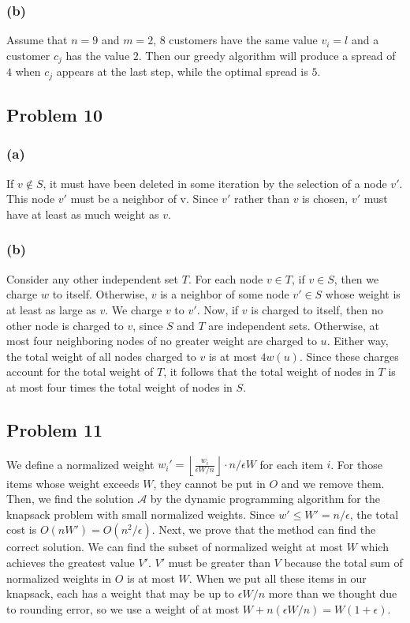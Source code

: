 \documentclass[12pt,onecolumn,a4paper]{article}
\begin{document}
\subsubsection*{(b)} 
Assume that $n=9$ and $m=2$, $8$ customers have the same value $v_i=l$ and a customer $c_j$ has the value $2$. Then our greedy algorithm will produce a spread of $4$ when $c_j$ appears at the last step, while the optimal spread is $5$.

\subsection*{Problem 10}
\subsubsection*{(a)} 
If $v \notin S$, it must have been deleted in some iteration by the selection of a node $v'$. This node $v'$ must be a neighbor of v. Since $v'$ rather than $v$ is chosen, $v'$ must have at least as much weight as $v$.
\subsubsection*{(b)} 
Consider any other independent set $T$. For each node $v \in T$, if $ v\in S$, then we charge $w$ to itself. Otherwise, $v$ is a neighbor of some node $ v'\in S$ whose weight is at least as large as $v$. We charge $v$ to $v'$. Now, if $v$ is charged to itself, then no other node is charged to $v$, since $S$ and $T$ are independent sets. Otherwise, at most four neighboring nodes of no greater weight are charged to $u$. Either way, the total weight of all nodes charged to $v$ is at most $4w(u)$. Since these charges account for the total weight of $T$, it follows that the total weight of nodes in $T$ is at most four times the total weight of nodes in $S$.
\subsection*{Problem 11}
We define a normalized weight $w_i' = \left\lfloor \frac{w_i}{\epsilon W/n}\right\rfloor \cdot n/\epsilon W$ for each item $i$. For those items whose weight exceeds $W$, they cannot be put in $O$ and we remove them. Then, we find the solution $\mathcal{A}$ by the dynamic programming algorithm for the knapsack problem with small normalized weights. Since $w' \le W' = n/\epsilon$, the total cost is $O(nW') = O(n^2 / \epsilon)$.
Next, we prove that the method can find the correct solution. We can find the subset of normalized weight at most $W$ which achieves the greatest value $V'$. $V'$ must be greater than $V$ because the total sum of normalized weights in $O$ is at most $W$. When we put all these items in our knapsack, each has a weight that may be up to $\epsilon W/n$ more than we thought due to rounding error, so we use a weight of at most $ W + n(\epsilon W/n)=W(1+\epsilon)$.
\end{document}
